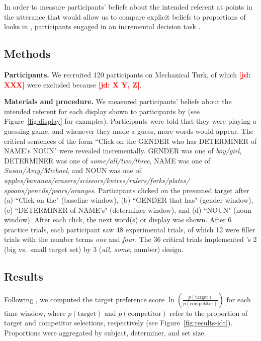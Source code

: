 \documentclass[10pt,letterpaper]{article}
\newcommand{\figref}[1]{Figure~\ref{#1}}
\newcommand{\jd}[1]{\textcolor{Red}{\textbf{[jd: #1]}}}
\begin{document}
In order to measure participants' beliefs about the intended referent at points in the utterance that would allow us to compare explicit beliefs to proportions of looks in , participants engaged in an incremental decision task \cite{Allopenna1998,QingLD2018, KreissDegen2020}. 

\subsection{Methods}

\textbf{Participants.} We recruited 120 participants on Mechanical Turk, of which \jd{XXX} were excluded because \jd{X Y, Z}. 

\textbf{Materials and procedure.} We measured participants' beliefs about the intended referent for each display shown to participants by  (see \figref{fig:display} for examples). Participants were told that they were playing a guessing game, and whenever they made a guess, more words would appear. The critical sentences of the form ``Click on the GENDER who has DETERMINER  of NAME's NOUN" were revealed incrementally. GENDER was one of \emph{boy/girl}, DETERMINER was one of \emph{some/all/two/three}, NAME was one of \emph{Susan/Amy/Michael}, and NOUN was one of \emph{apples/bananas/erasers/scissors/knives/rulers/forks/plates/
spoons/pencils/pears/oranges}.  Participants clicked on the presumed target after (a) ``Click on the" (baseline window), (b) ``GENDER that has" (gender window), (c) ``DETERMINER of NAME's" (determiner window), and (d) ``NOUN" (noun window). After each click, the next word(s) or display was shown. After 6 practice trials, each participant saw 48 experimental trials, of which 12 were filler trials with the number terms \emph{one} and \emph{four}. The 36 critical trials implemented 's 2 (big vs.~small target set) by 3 (\emph{all, some}, number) design. 


\subsection{Results}

Following , we computed the target preference score $\ln (\frac{p(\text{target})}{p(\text{competitor})})$ for each time window, where  $p(\text{target})$ and $p(\text{competitor})$ refer to the proportion of target and competitor selections, respectively (see \figref{fig:results-idt}). Proportions were aggregated by subject, determiner, and set size. 
\end{document}
